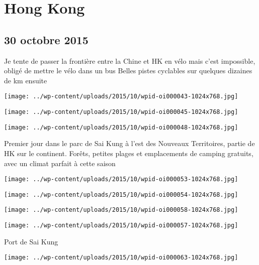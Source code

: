 \chapter{Hong Kong}
\section*{30 octobre 2015}
Je tente de passer la frontière entre la Chine et HK en vélo mais c'est impossible, obligé de mettre le vélo dans un bus \newline
 Belles pistes cyclables sur quelques dizaines de km ensuite \newline
 \newline
\centerline{\texttt{[image: ../wp-content/uploads/2015/10/wpid-oi000043-1024x768.jpg]} } 
 \newline
 \newline
\centerline{\texttt{[image: ../wp-content/uploads/2015/10/wpid-oi000045-1024x768.jpg]} } 
 \newline
 \newline
\centerline{\texttt{[image: ../wp-content/uploads/2015/10/wpid-oi000048-1024x768.jpg]} } 
 \newline
 Premier jour dans le parc de Sai Kung à l'est des Nouveaux Territoires, partie de HK sur le continent. Forêts, petites plages et emplacements de camping gratuits, avec un climat parfait à cette saison \newline
 \newline
\centerline{\texttt{[image: ../wp-content/uploads/2015/10/wpid-oi000053-1024x768.jpg]} } 
 \newline
 \newline
\centerline{\texttt{[image: ../wp-content/uploads/2015/10/wpid-oi000054-1024x768.jpg]} } 
 \newline
 \newline
\centerline{\texttt{[image: ../wp-content/uploads/2015/10/wpid-oi000058-1024x768.jpg]} } 
 \newline
 \newline
\centerline{\texttt{[image: ../wp-content/uploads/2015/10/wpid-oi000057-1024x768.jpg]} } 
 \newline
 Port de Sai Kung \newline
 \newline
\centerline{\texttt{[image: ../wp-content/uploads/2015/10/wpid-oi000063-1024x768.jpg]} } 
 \newline
 \newline
